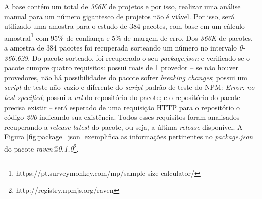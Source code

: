 \begin{table}[!h]
    \caption{Formato da base de dados para cada pacote do NPM}
    \label{tab:database}
\end{table}

A base contém um total de \textit{366K} de projetos e por isso, realizar uma análise manual para um número gigantesco de projetos não é viável. Por isso, será utilizado uma amostra para o estudo de 384 pacotes, com base em um cálculo amostral\footnote{https://pt.surveymonkey.com/mp/sample-size-calculator/} com 95\% de confiança e 5\% de margem de erro. Dos \textit{366K} de pacotes, a amostra de 384 pacotes foi recuperada sorteando um número no intervalo \textit{0-366,629}. Do pacote sorteado, foi recuperado o seu \textit{package.json} e verificado se o pacote cumpre quatro requisitos: possui mais de 1 provedor --  se não houver provedores, não há possibilidades do pacote sofrer \textit{breaking changes}; possui um \textit{script} de teste não vazio e diferente do \textit{script} padrão de teste do \gls{NPM}: \textit{Error: no test specified}; possui a \textit{url} do repositório do pacote; e o repositório do pacote precisa existir -- será esperado de uma requisição \Gls{HTTP} para o repositório o código \textit{200} indicando sua existência. Todos esses requisitos foram analisados recuperando a \textit{release latest} do pacote, ou seja, a última \textit{release} disponível. A Figura \ref{fig:package_json} exemplifica as informações pertinentes no \textit{package.json} do pacote \textit{raven@0.1.0}\footnote{http://registry.npmjs.org/raven}.

